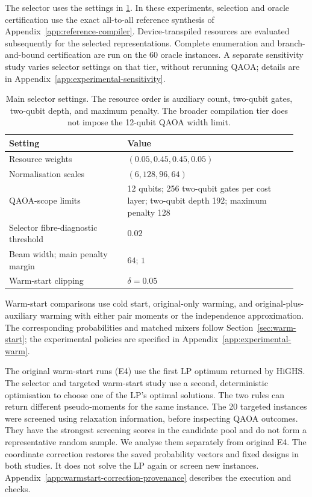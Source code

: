 \documentclass[a4paper,onecolumn,11pt,unpublished]{quantumarticle}
\theoremstyle{remark}
\begin{document}
The selector uses the settings in \cref{tab:selector-settings}. In these
experiments, selection and oracle certification use the exact all-to-all
reference synthesis of Appendix~\ref{app:reference-compiler}.
Device-transpiled resources are evaluated subsequently for the selected
representations. Complete
enumeration and branch-and-bound certification are run on the 60 oracle
instances. A separate sensitivity study varies selector settings on that tier,
without rerunning QAOA; details are in Appendix~\ref{app:experimental-sensitivity}.

\begin{table}[t]
\centering
\small
\caption{Main selector settings. The resource order is auxiliary count,
two-qubit gates, two-qubit depth, and maximum penalty. The broader compilation
tier does not impose the 12-qubit QAOA width limit.}
\label{tab:selector-settings}
\begin{tabular}{@{}p{0.39\linewidth}p{0.56\linewidth}@{}}
\toprule
Setting & Value\\
\midrule
Resource weights & $(0.05,0.45,0.45,0.05)$\\
Normalisation scales & $(6,128,96,64)$\\
QAOA-scope limits & 12 qubits; 256 two-qubit gates per cost layer;
 two-qubit depth 192; maximum penalty 128\\
Selector fibre-diagnostic threshold & $0.02$\\
Beam width; main penalty margin & $64$; $1$\\
Warm-start clipping & $\delta=0.05$\\
\bottomrule
\end{tabular}
\end{table}

Warm-start comparisons use cold start, original-only warming, and
original-plus-auxiliary warming with either pair moments or the independence
approximation. The corresponding probabilities and matched mixers follow
Section~\ref{sec:warm-start}; the experimental policies are specified in
Appendix~\ref{app:experimental-warm}.

The original warm-start runs (E4) use the first LP optimum returned by HiGHS.
The selector and targeted warm-start study use a second, deterministic
optimisation to choose one of the LP's optimal solutions. The two rules can
return different pseudo-moments for the same instance. The 20 targeted
instances were screened using relaxation information, before inspecting
QAOA outcomes. They have the strongest screening scores in the candidate
pool and do not form a representative random sample. We analyse them
separately from original E4.
The coordinate correction restores the saved probability vectors and fixed
designs in both studies. It does not solve the LP again or screen new
instances. Appendix~\ref{app:warmstart-correction-provenance} describes the
execution and checks.
\end{document}
